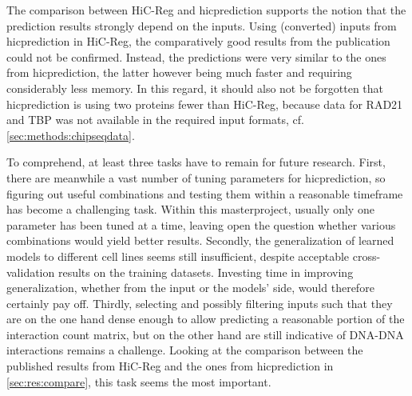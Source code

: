 The comparison between HiC-Reg and hicprediction supports the notion 
that the prediction results strongly depend on the inputs.
Using (converted) inputs from hicprediction in HiC-Reg, 
the comparatively good results from the publication \cite{Zhang2019} could not be confirmed.
Instead, the predictions were very similar to the ones from hicprediction,
the latter however being much faster and requiring considerably less memory.
In this regard, it should also not be forgotten that hicprediction
is using two proteins fewer than HiC-Reg, because data for RAD21
and TBP was not available in the required input formats, cf.\;\autoref{sec:methods:chipseqdata}.

To comprehend, at least three tasks have to remain for future research.
First, there are meanwhile a vast number of tuning parameters for hicprediction,
so figuring out useful combinations and testing them within
a reasonable timeframe has become a challenging task. 
Within this masterproject, usually only one parameter has been tuned at a time, 
leaving open the question whether various combinations would yield better results.
Secondly, the generalization of learned models to different cell lines seems still insufficient,
despite acceptable cross-validation results on the training datasets.
Investing time in improving generalization, whether from the input or the models' side,
would therefore certainly pay off.
Thirdly, selecting and possibly filtering inputs such that they are on the one hand dense enough 
to allow predicting a reasonable portion of the interaction count matrix,
but on the other hand are still indicative of DNA-DNA interactions remains a challenge.
Looking at the comparison between the published results from HiC-Reg and the ones from hicprediction
in \autoref{sec:res:compare}, this task seems the most important.





